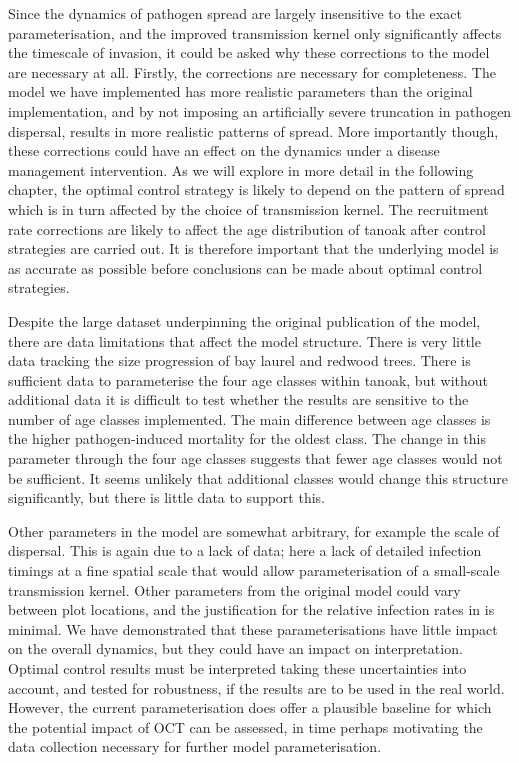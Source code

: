 Since the dynamics of pathogen spread are largely insensitive to the exact parameterisation, and the improved transmission kernel only significantly affects the timescale of invasion, it could be asked why these corrections to the model are necessary at all. Firstly, the corrections are necessary for completeness. The model we have implemented has more realistic parameters than the original implementation, and by not imposing an artificially severe truncation in pathogen dispersal, results in more realistic patterns of spread. More importantly though, these corrections could have an effect on the dynamics under a disease management intervention. As we will explore in more detail in the following chapter, the optimal control strategy is likely to depend on the pattern of spread \citep{hyatt-twynam_risk-based_2017} which is in turn affected by the choice of transmission kernel. The recruitment rate corrections are likely to affect the age distribution of tanoak after control strategies are carried out. It is therefore important that the underlying model is as accurate as possible before conclusions can be made about optimal control strategies.

Despite the large dataset underpinning the original publication of the model, there are data limitations that affect the model structure. There is very little data tracking the size progression of bay laurel and redwood trees. There is sufficient data to parameterise the four age classes within tanoak, but without additional data it is difficult to test whether the results are sensitive to the number of age classes implemented. The main difference between age classes is the higher pathogen-induced mortality for the oldest class. The change in this parameter through the four age classes suggests that fewer age classes would not be sufficient. It seems unlikely that additional classes would change this structure significantly, but there is little data to support this.

Other parameters in the model are somewhat arbitrary, for example the scale of dispersal. This is again due to a lack of data; here a lack of detailed infection timings at a fine spatial scale that would allow parameterisation of a small-scale transmission kernel. Other parameters from the original model could vary between plot locations, and the justification for the relative infection rates in \citet{cobb_ecosystem_2012} is minimal. We have demonstrated that these parameterisations have little impact on the overall dynamics, but they could have an impact on interpretation. Optimal control results must be interpreted taking these uncertainties into account, and tested for robustness, if the results are to be used in the real world. However, the current parameterisation does offer a plausible baseline for which the potential impact of OCT can be assessed, in time perhaps motivating the data collection necessary for further model parameterisation.

